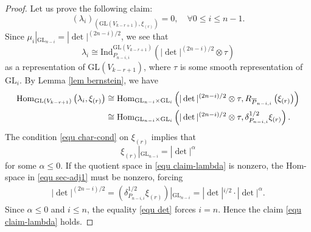 \documentclass[11pt,reqno]{amsart}
\renewcommand{\1}{{\mathbf{1}}} \newcommand{\sB}{{\mathscr{B}}}
\newcommand{\GL}{{\mathrm{GL}}}\newcommand{\G}{{\mathrm{G}}}
\newcommand{\Ind}{{\mathrm{Ind}}} \newcommand{\ind}{{\mathrm{ind}}}
\theoremstyle{plain}
\theoremstyle{definition}
\numberwithin{equation}{section}
\begin{document}
\begin{proof}
Let us prove the following claim: \begin{equation}\label{equ claim-lambda}\left(\lambda_i \right)_{\left(\GL(V_{k-r+1}),\xi_{(r)}\right)}=0,\quad\forall 0\leq i\leq n-1.\end{equation} 
Since $\mu_{i}|_{\GL_{n-i}}=|\det|^{(2n-i)/2}$, we see that
$$\lambda_i\cong\Ind_{P_{n-i,i}}^{\GL(V_{k-r+1})}\left(|\det|^{(2n-i)/2}\otimes\tau\right)$$ as a representation of $\GL(V_{k-r+1})$, where $\tau$ is some smooth representation of $\GL_i$.
By Lemma \ref{lem bernstein}, we have
\begin{equation}\label{equ sec-adj1}\begin{aligned}\Hom_{\GL(V_{k-r+1})}\left(\lambda_i, \xi_{(r)}\right)
&\cong\Hom_{\GL_{n-i}\times\GL_i}\left(|\det|^{(2n-i)/2}\otimes\tau, R_{\overline{P}_{n-i,i}}\left(\xi_{(r)}\right)\right)\\
&\cong\Hom_{\GL_{n-i}\times\GL_i}\left(|\det|^{(2n-i)/2}\otimes\tau, \delta_{P_{n-i,i}}^{1/2}\xi_{(r)}\right).
\end{aligned}\end{equation}
The condition \eqref{equ char-cond} on $\xi_{(r)}$ implies that $$\xi_{(r)}|_{\GL_{n-i}}=|\det|^\alpha$$ for some $\alpha\leq0$.
If the quotient space in \eqref{equ claim-lambda} is nonzero,  the Hom-space in \eqref{equ sec-adj1} must be nonzero, forcing 
\begin{equation}\label{equ det}\begin{aligned}|\det|^{(2n-i)/2}=\left(\delta_{P_{n-i,i}}^{1/2}\xi_{(r)}\right)|_{\GL_{n-i}}
=|\det|^{i/2}\cdot|\det|^\alpha.
\end{aligned}\end{equation}
Since $\alpha\leq0$ and $i\leq n$, the equality \eqref{equ det} forces  $i=n$. Hence the claim \eqref{equ claim-lambda} holds.


\end{proof}
\end{document}

